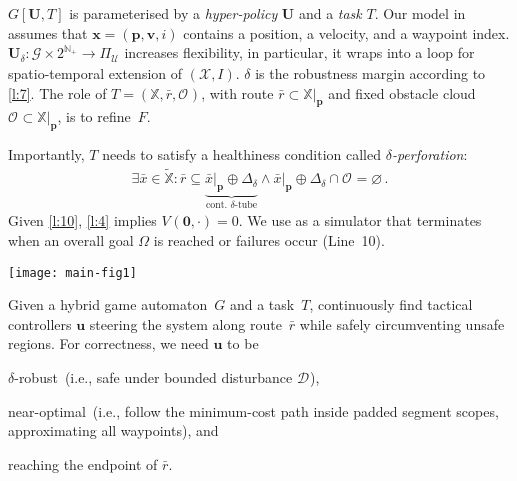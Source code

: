 \documentclass{article}
\newcommand\mkYcAoM[1][]{\mathcal{D}_{#1}}
\newcommand\mpBykPY[1][]{\mathcal{U}_{#1}}
\newcommand\mCBuiuW[1]{2^{#1}}
\newcommand\mijCQyI[1][]{V^{#1}}
\renewcommand\vec[1]{\mathbf{#1}}
\newcommand\mBuHESu[1][\delta]{\Delta_{#1}}
\newcommand\mORCysO[1][]{\mathcal{O}_{\mathsf{#1}}}
\newcommand\mQtakuY[1][x]{\bar{#1}}
\begin{document}
{$G[\vec{U},T]$ is parameterised by a
\emph{hyper-policy} $\vec{U}$ and a \emph{task} $T$.  Our
model in \cite{Gleirscher2025-ParametricModelOptimal} assumes that
${\vec{x}}=({\vec{p}},{\vec{v}},i)$ contains a position, a velocity, and
a waypoint index.
\label{l:9}%
$\vec{U}_{\delta}\colon\mathcal{G}\times\mCBuiuW{\mathbb{N}_+}
\to\Pi_{\mpBykPY}$ increases flexibility, in particular, it
wraps  into a loop for spatio-temporal extension of
$(\mathcal{X},I)$.  $\delta$ is the robustness margin
according to \eqref{l:7}.
The role of $T = ({\mathbb{X}},{\bar{r}},\mORCysO)$, with route
${\bar{r}}\subset{\mathbb{X}}|_{\vec{p}}$ and fixed obstacle cloud
$\mORCysO\subset{\mathbb{X}}|_{\vec{p}}$, is to refine~$F$.

Importantly, $T$ needs to satisfy a healthiness condition called
\emph{$\delta$-perforation}:
\begin{align}
  \label{l:10}
  \exists \mQtakuY\in\tilde{\mathbb{X}}\colon
  {\bar{r}}\subseteq
  \underbrace{\mQtakuY|_{{\vec{p}}}\oplus\mBuHESu}_{\text{cont.\ $\delta$-tube}}
  \land
  \mQtakuY|_{{\vec{p}}}\oplus\mBuHESu 
  \cap\mORCysO=\varnothing\,.
\end{align}
Given \eqref{l:10}, \eqref{l:4}
implies $\mijCQyI(\vec 0,\cdot)=0$.
We use  as a simulator that terminates when
an overall goal $\Omega$ is reached or failures occur
(Line~10).

\begin{algorithm}
  \caption{%
    Hybrid game player (with restricted task updates)}
  \label{l:11}
\texttt{[image: main-fig1]}%
\end{algorithm}

\begin{definition}
  \label{l:12}
  Given a hybrid game automaton~$G$ and a task~$T$, continuously
  find tactical controllers ${\vec{u}}$ steering the system 
  along route~${\bar{r}}$ while safely circumventing unsafe
  regions. 
  For correctness, we need ${\vec{u}}$ to be
  \begin{inparaenum}[(i)]
  \item $\delta$-robust~(i.e., safe under bounded disturbance
    $\mkYcAoM$),
  \item near-optimal~(i.e., follow the minimum-cost path inside
    padded segment scopes, approximating all waypoints), and
  \item reaching the endpoint of ${\bar{r}}$.
  \end{inparaenum}
\end{definition}
 

}
\end{document}
